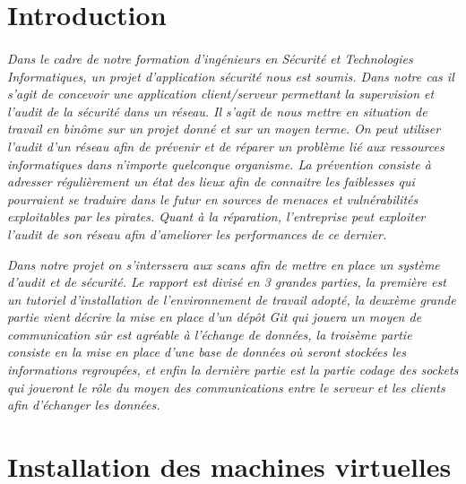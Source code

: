 \documentclass[11pt,a4paper,titlepage, oneside]{article}
\begin{document}
\section*{{\color{red}Introduction}}
	\paragraph{}
\textsl{Dans le cadre de notre formation d'ingénieurs en Sécurité et Technologies Informatiques, un projet d'application sécurité nous est soumis. Dans notre cas il s'agit de concevoir une application client/serveur permettant la supervision et l'audit de la sécurité dans un réseau. Il s'agit de nous mettre en situation de travail en binôme  sur un projet donné et sur un moyen terme. 
On peut utiliser l'audit d'un réseau afin de prévenir et de réparer un problème lié aux ressources informatiques dans n'importe quelconque organisme. La prévention consiste à adresser régulièrement un état des lieux afin de connaitre les faiblesses qui pourraient se traduire dans le futur en sources de menaces et vulnérabilités exploitables par les pirates.
Quant à la réparation, l'entreprise peut exploiter l'audit de son réseau afin d'ameliorer les performances de ce dernier. 	}	

\textsl{
Dans notre projet on s'interssera aux scans afin de mettre en place un système d'audit et de sécurité.
Le rapport est divisé en 3 grandes parties, la première est un tutoriel d'installation de l'environnement de travail adopté, la deuxème grande partie vient décrire la mise en place d'un dépôt Git qui jouera un moyen de communication sûr est agréable à l'échange de données, la troisème partie consiste en la mise en place d'une base de données où seront stockées les informations regroupées, et enfin la dernière partie est la partie codage des sockets qui joueront le rôle du moyen des communications entre le serveur et les clients afin d'échanger les données.}
		
\newpage
\thispagestyle{empty}
\tableofcontents
\newpage
\listoffigures  %

\newpage
{} \setcounter{page}{1}
\section{{\color{red}Installation des machines virtuelles}}
\subsection{{\color{blue}{Installation du serveur Debian}}}
\end{document}
